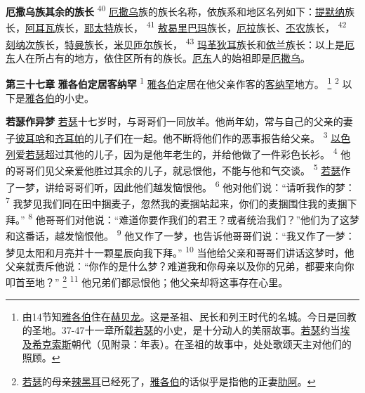 \textbf{厄撒乌族其余的族长 }
\textsuperscript{40}
\uline{厄撒乌}族的族长名称，依族系和地区名列如下：\uline{提默纳}族长，\uline{阿耳瓦}族长，\uline{耶太特}族长，
\textsuperscript{41}
\uline{敖曷里}\uline{巴玛}族长，\uline{厄拉}族长、\uline{丕农}族长，
\textsuperscript{42}
\uline{刻纳次}族长，\uline{特曼}族长，\uline{米贝}\uline{匝尔}族长，
\textsuperscript{43}
\uline{玛革狄耳}族长和\uline{依兰}族长：以上是\uline{厄东}人在所占有的地方，依住区所有的族长。\uline{厄东}人的始祖即是\uline{厄撒乌}。

\textbf{第三十七章 }
\textbf{雅各伯定居客纳罕 }
\textsuperscript{1}
\uline{雅各伯}定居在他父亲作客的\uline{客纳罕}地方。
\footnote{由14节知\uline{雅各伯}住在\uline{赫贝龙}。这是圣祖、民长和列王时代的名城。今日是回教的圣地。37-47十一章所载\uline{若瑟}的小史，是十分动人的美丽故事。\uline{若瑟}约当\uline{埃及}\uline{希克索斯}朝代（见附录：年表）。在圣祖的故事中，处处歌颂天主对他们的照顾。}
\textsuperscript{2}
以下是\uline{雅各伯}的小史。

\textbf{若瑟作异梦 }
\uline{若瑟}十七岁时，与哥哥们一同放羊。他尚年幼，常与自己的父亲的妻子\uline{彼耳哈}和\uline{齐耳帕}的儿子们在一起。他不断将他们作的恶事报告给父亲。
\textsuperscript{3}
\uline{以色列}爱\uline{若瑟}超过其他的儿子，因为是他年老生的，并给他做了一件彩色长衫。
\textsuperscript{4}
他的哥哥们见父亲爱他胜过其余的儿子，就忌恨他，不能与他和气交谈。
\textsuperscript{5}
\uline{若瑟}作了一梦，讲给哥哥们听，因此他们越发恼恨他。
\textsuperscript{6}
他对他们说：“请听我作的梦：
\textsuperscript{7}
我梦见我们同在田中捆麦子，忽然我的麦捆站起来，你们的麦捆围住我的麦捆下拜。”
\textsuperscript{8}
他哥哥们对他说：“难道你要作我们的君王？或者统治我们？”他们为了这梦和这番话，越发恼恨他。
\textsuperscript{9}
他又作了一梦，也告诉他哥哥们说：“我又作了一梦：梦见太阳和月亮并十一颗星辰向我下拜。”
\textsuperscript{10}
当他给父亲和哥哥们讲话这梦时，他父亲就责斥他说：“你作的是什么梦？难道我和你母亲以及你的兄弟，都要来向你叩首至地？”
\footnote{\uline{若瑟}的母亲\uline{辣黑耳}已经死了，\uline{雅各伯}的话似乎是指他的正妻\uline{肋阿}。}
\textsuperscript{11}
他兄弟们都忌恨他；他父亲却将这事存在心里。

